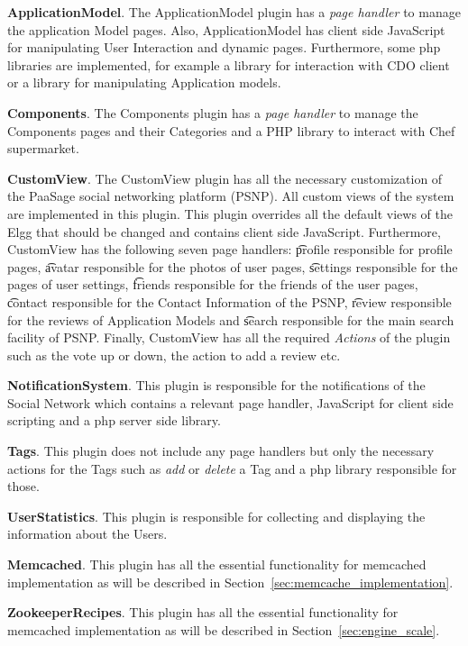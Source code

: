 \textbf{ApplicationModel}. The ApplicationModel plugin has a {\it page handler} to manage the application Model pages. Also, ApplicationModel has client side JavaScript for manipulating User Interaction and dynamic pages. Furthermore, some php libraries are implemented, for example a library for interaction with CDO client or a library for manipulating Application models. 

\textbf{Components}. The Components plugin has a {\it page handler} to manage the Components pages and their Categories and a PHP library to interact with Chef supermarket.

\textbf{CustomView}. The CustomView plugin has all the necessary customization of the PaaSage social networking platform (PSNP). All custom views of the system are implemented in this plugin. This plugin overrides all the default views of the Elgg that should be changed and contains client side JavaScript. Furthermore, CustomView has the following seven page handlers: {\t profile} responsible for profile pages, {\t avatar} responsible for the photos of user pages, {\t settings} responsible for the pages of user settings, {\t friends} responsible for the friends of the user pages, {\t contact} responsible for the Contact Information of the PSNP, {\t review} responsible for the reviews of Application Models and {\t search} responsible for the main search facility of PSNP. Finally, CustomView has all the required \emph{Actions} of the plugin such as the vote up or down, the action to add a review etc.

\textbf{NotificationSystem}. This plugin is responsible for the notifications of the Social Network which contains a relevant page handler, JavaScript for client side scripting and a php server side library.

\textbf{Tags}. This plugin does not include any page handlers but only the necessary actions for the Tags such as {\it add} or {\it delete} a Tag and a php library responsible for those. 

\textbf{UserStatistics}. This plugin is responsible for collecting and displaying the information about the Users.

\textbf{Memcached}. This plugin has all the essential functionality for memcached implementation as will be described in Section~\ref{sec:memcache_implementation}.

\textbf{ZookeeperRecipes}. This plugin has all the essential functionality for memcached implementation as will be described in Section~\ref{sec:engine_scale}.

